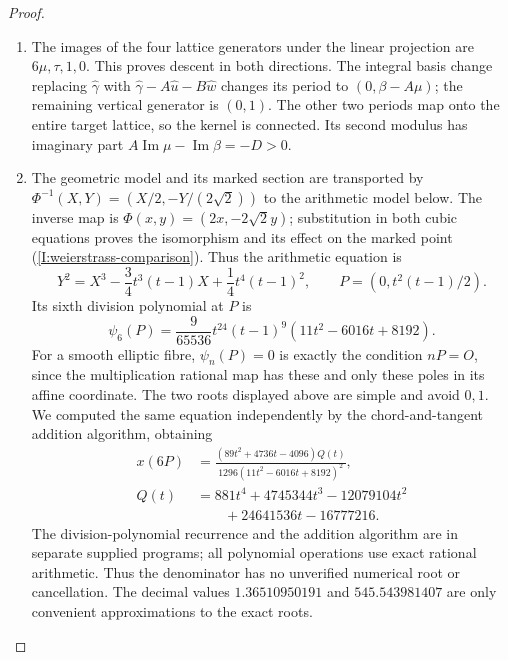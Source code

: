 \begin{proof}
\begin{enumerate}[label=\arabic*.,leftmargin=*]
\item The images of the four lattice generators under the linear projection
are \(6\mu,\tau,1,0\). This proves descent in both directions.
The integral basis change replacing \(\widehat\gamma\) with
\(\widehat\gamma-A\widehat u-B\widehat w\) changes its period to
\((0,\beta-A\mu)\); the remaining vertical generator is \((0,1)\).
The other two periods map onto the entire target lattice, so the kernel
is connected. Its second modulus has imaginary part
\(A\operatorname{Im}\mu-\operatorname{Im}\beta=-D>0\).

\item The geometric model and its marked section are transported by
$\Phi^{-1}(X,Y)=(X/2,-Y/(2\sqrt2))$ to the arithmetic model
below. The inverse map is
$\Phi(x,y)=(2x,-2\sqrt2y)$; substitution in both cubic
equations proves the isomorphism and its effect on the marked point
(\cref{I:weierstrass-comparison}). Thus the arithmetic equation is
\[
 Y^2=X^3-\frac34t^3(t-1)X+\frac14t^4(t-1)^2,
 \qquad P=(0,t^2(t-1)/2).
\]
Its sixth division polynomial at \(P\) is
\[
 \psi_6(P)=\frac9{65536}t^{24}(t-1)^9
 (11t^2-6016t+8192).
\]
For a smooth elliptic fibre, \(\psi_n(P)=0\) is exactly the condition
\(nP=O\), since the multiplication rational map has these and only these
poles in its affine coordinate. The two roots displayed above are simple
and avoid \(0,1\). We computed the same equation independently by the
chord-and-tangent addition algorithm, obtaining
\[
 \begin{aligned}
 x(6P)&=\frac{(89t^2+4736t-4096)Q(t)}
 {1296(11t^2-6016t+8192)^2},\\
 Q(t)&=881t^4+4745344t^3-12079104t^2\\
 &\hspace{2em}+24641536t-16777216.
 \end{aligned}
\]
The division-polynomial recurrence and the addition algorithm are in
separate supplied programs; all polynomial operations use exact rational
arithmetic. Thus the denominator has no unverified numerical root or
cancellation. The decimal values \(1.36510950191\) and
\(545.543981407\) are only convenient approximations to the exact roots.
\end{enumerate}
\end{proof}


